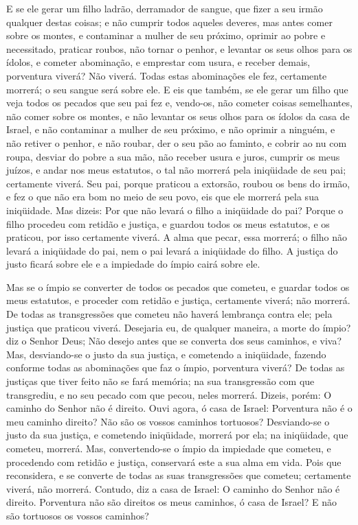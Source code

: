 E se ele gerar um filho ladrão, derramador de sangue, que fizer a
seu irmão qualquer destas coisas; e não cumprir todos aqueles
deveres, mas antes comer sobre os montes, e contaminar a mulher de
seu próximo, oprimir ao pobre e necessitado, praticar roubos,
não tornar o penhor, e levantar os seus olhos para os ídolos, e
cometer abominação, e emprestar com usura, e receber demais,
porventura viverá? Não viverá. Todas estas abominações ele fez,
certamente morrerá; o seu sangue será sobre ele. E eis que
também, se ele gerar um filho que veja todos os pecados que seu pai
fez e, vendo-os, não cometer coisas semelhantes, não comer
sobre os montes, e não levantar os seus olhos para os ídolos da casa
de Israel, e não contaminar a mulher de seu próximo, e não
oprimir a ninguém, e não retiver o penhor, e não roubar, der o seu
pão ao faminto, e cobrir ao nu com roupa, desviar do pobre a
sua mão, não receber usura e juros, cumprir os meus juízos, e andar
nos meus estatutos, o tal não morrerá pela iniqüidade de seu pai;
certamente viverá. Seu pai, porque praticou a extorsão,
roubou os bens do irmão, e fez o que não era bom no meio de seu
povo, eis que ele morrerá pela sua iniqüidade. Mas dizeis:
Por que não levará o filho a iniqüidade do pai? Porque o filho
procedeu com retidão e justiça, e guardou todos os meus estatutos, e
os praticou, por isso certamente viverá. A alma que pecar,
essa morrerá; o filho não levará a iniqüidade do pai, nem o pai
levará a iniqüidade do filho. A justiça do justo ficará sobre ele e
a impiedade do ímpio cairá sobre ele.

Mas se o ímpio se converter de todos os pecados que cometeu, e
guardar todos os meus estatutos, e proceder com retidão e justiça,
certamente viverá; não morrerá. De todas as transgressões que
cometeu não haverá lembrança contra ele; pela justiça que praticou
viverá. Desejaria eu, de qualquer maneira, a morte do ímpio?
diz o Senhor Deus; Não desejo antes que se converta dos seus
caminhos, e viva? Mas, desviando-se o justo da sua justiça, e
cometendo a iniqüidade, fazendo conforme todas as abominações que
faz o ímpio, porventura viverá? De todas as justiças que tiver feito
não se fará memória; na sua transgressão com que transgrediu, e no
seu pecado com que pecou, neles morrerá. Dizeis, porém: O
caminho do Senhor não é direito. Ouvi agora, ó casa de Israel:
Porventura não é o meu caminho direito? Não são os vossos caminhos
tortuosos? Desviando-se o justo da sua justiça, e cometendo
iniqüidade, morrerá por ela; na iniqüidade, que cometeu, morrerá.
Mas, convertendo-se o ímpio da impiedade que cometeu, e
procedendo com retidão e justiça, conservará este a sua alma em
vida. Pois que reconsidera, e se converte de todas as suas
transgressões que cometeu; certamente viverá, não morrerá.
Contudo, diz a casa de Israel: O caminho do Senhor não é
direito. Porventura não são direitos os meus caminhos, ó casa de
Israel? E não são tortuosos os vossos caminhos?

